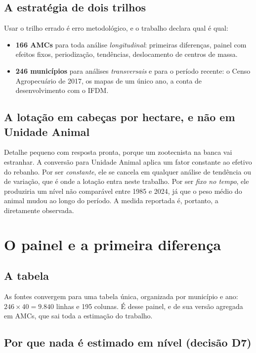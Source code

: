 \section{A estratégia de dois trilhos}

Usar o trilho errado é erro metodológico, e o trabalho declara qual é qual:

\begin{itemize}
\item \textbf{166 AMCs} para toda análise \emph{longitudinal}: primeiras
diferenças, painel com efeitos fixos, periodização, tendências, deslocamento de
centros de massa.
\item \textbf{246 municípios} para análises \emph{transversais} e para o
período recente: o Censo Agropecuário de 2017, os mapas de um único ano, a
conta de desenvolvimento com o IFDM.
\end{itemize}

\section{A lotação em cabeças por hectare, e não em Unidade Animal}

Detalhe pequeno com resposta pronta, porque um zootecnista na banca vai
estranhar. A conversão para Unidade Animal aplica um fator constante ao efetivo
do rebanho. Por ser \emph{constante}, ele se cancela em qualquer análise de
tendência ou de variação, que é onde a lotação entra neste trabalho. Por ser
\emph{fixo no tempo}, ele produziria um nível não comparável entre 1985 e 2024,
já que o peso médio do animal mudou ao longo do período. A medida reportada é,
portanto, a diretamente observada.

\chapter{O painel e a primeira diferença}

\section{A tabela}

As fontes convergem para uma tabela única, organizada por município e ano:
$246 \times 40 = 9.840$ linhas e 195 colunas. É desse painel, e de sua versão
agregada em AMCs, que sai toda a estimação do trabalho.

\section{Por que nada é estimado em nível (decisão D7)}

